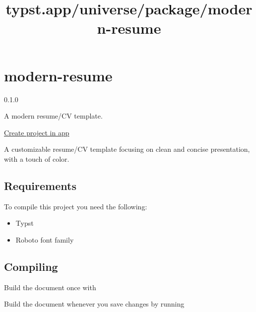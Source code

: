 \title{typst.app/universe/package/modern-resume}

\label{banner}
\label{template-thumbnail}

\section{modern-resume}\label{modern-resume}

{ 0.1.0 }

A modern resume/CV template.

\href{/app?template=modern-resume&version=0.1.0}{Create project in app}

\label{readme}
\href{https://github.com/peterpf/modern-typst-resume/stargazers}{\pandocbounded{}}

A customizable resume/CV template focusing on clean and concise
presentation, with a touch of color.

\subsection{Requirements}\label{requirements}

To compile this project you need the following:

\begin{itemize}
\tightlist
\item
  Typst
\item
  Roboto font family
\end{itemize}

\subsection{Compiling}\label{compiling}

Build the document once with

\begin{Shaded}
\begin{Highlighting}[]
\end{Highlighting}
\end{Shaded}

Build the document whenever you save changes by running

\begin{Shaded}
\begin{Highlighting}[]
\end{Highlighting}
\end{Shaded}

